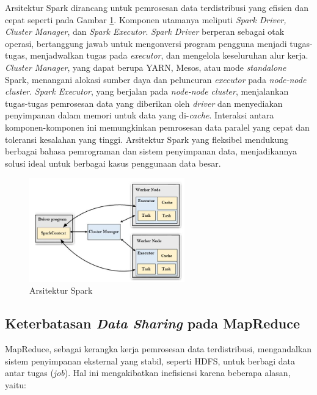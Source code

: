 Arsitektur Spark dirancang untuk pemrosesan data terdistribusi yang efisien dan cepat seperti pada Gambar \ref{fig:spark-arch}. Komponen utamanya meliputi \textit{Spark Driver, Cluster Manager}, dan \textit{Spark Executor}. \textit{Spark Driver} berperan sebagai otak operasi, bertanggung jawab untuk mengonversi program pengguna menjadi tugas-tugas, menjadwalkan tugas pada \textit{executor}, dan mengelola keseluruhan alur kerja. \textit{Cluster Manager}, yang dapat berupa YARN, Mesos, atau mode \textit{standalone} Spark, menangani alokasi sumber daya dan peluncuran \textit{executor} pada \textit{node-node cluster}. \textit{Spark Executor}, yang berjalan pada \textit{node-node cluster}, menjalankan tugas-tugas pemrosesan data yang diberikan oleh \textit{driver} dan menyediakan penyimpanan dalam memori untuk data yang di-\textit{cache}. Interaksi antara komponen-komponen ini memungkinkan pemrosesan data paralel yang cepat dan toleransi kesalahan yang tinggi. Arsitektur Spark yang fleksibel mendukung berbagai bahasa pemrograman dan sistem penyimpanan data, menjadikannya solusi ideal untuk berbagai kasus penggunaan data besar.

\begin{figure}[h]
    \centering
    \includegraphics[width=0.6\textwidth]{figures/ch02/spark-arch.jpeg}
    \caption{Arsitektur Spark}
    \label{fig:spark-arch}
\end{figure}

\subsection{Keterbatasan \textit{Data Sharing} pada MapReduce}

MapReduce, sebagai kerangka kerja pemrosesan data terdistribusi, mengandalkan sistem penyimpanan eksternal yang stabil, seperti HDFS, untuk berbagi data antar tugas (\textit{job}). Hal ini mengakibatkan inefisiensi karena beberapa alasan, yaitu:

